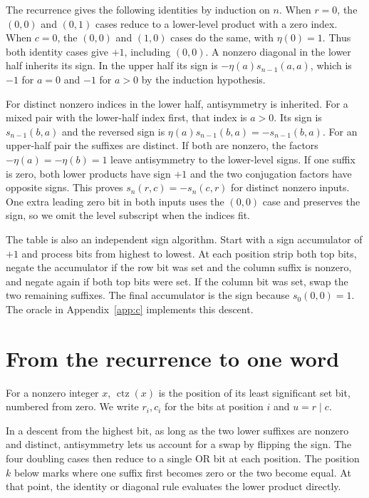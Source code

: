 \documentclass[11pt]{article}
\newcommand{\ctz}{\operatorname{ctz}}
\newcommand{\bor}{\mathbin{\vert}}
\begin{document}
The recurrence gives the following identities by induction on \(n\).
When \(r=0\), the \((0,0)\) and \((0,1)\) cases reduce to a
lower-level product with a zero index. When \(c=0\), the \((0,0)\)
and \((1,0)\) cases do the same, with \(\eta(0)=1\). Thus both
identity cases give \(+1\), including \((0,0)\). A nonzero diagonal
in the lower half inherits its sign. In the upper half its sign is
\(-\eta(a)s_{n-1}(a,a)\), which is \(-1\) for \(a=0\) and
\(-1\) for \(a>0\) by the induction hypothesis.

For distinct nonzero indices in the lower half, antisymmetry is inherited.
For a mixed pair with the lower-half index first, that index is \(a>0\).
Its sign is \(s_{n-1}(b,a)\) and the reversed sign is
\(\eta(a)s_{n-1}(b,a)=-s_{n-1}(b,a)\). For an upper-half pair the
suffixes are distinct. If both are nonzero, the factors
\(-\eta(a)=-\eta(b)=1\) leave antisymmetry to the lower-level signs.
If one suffix is zero, both lower products have sign \(+1\) and the
two conjugation factors have opposite signs. This proves
\(s_n(r,c)=-s_n(c,r)\) for distinct nonzero inputs. One extra leading
zero bit in both inputs uses the \((0,0)\) case and preserves the sign,
so we omit the level subscript when the indices fit.

The table is also an independent sign algorithm. Start with a sign
accumulator of \(+1\) and process bits from highest to lowest. At each
position strip both top bits, negate the accumulator if the row bit was
set and the column suffix is nonzero, and negate again if both top bits
were set. If the column bit was set, swap the two remaining suffixes.
The final accumulator is the sign because \(s_0(0,0)=1\). The oracle
in Appendix~\ref{app:c} implements this descent.

\section{From the recurrence to one word}
For a nonzero integer \(x\), \(\ctz(x)\) is the position of its least
significant set bit, numbered from zero. We write \(r_i,c_i\) for the
bits at position \(i\) and \(u=r\bor c\).

In a descent from the highest bit, as long as the two lower suffixes
are nonzero and distinct, antisymmetry lets us account for a swap
by flipping the sign. The four doubling cases then reduce to a
single OR bit at each position. The position \(k\) below marks where
one suffix first becomes zero or the two become equal. At that point,
the identity or diagonal rule evaluates the lower product directly.
\end{document}
